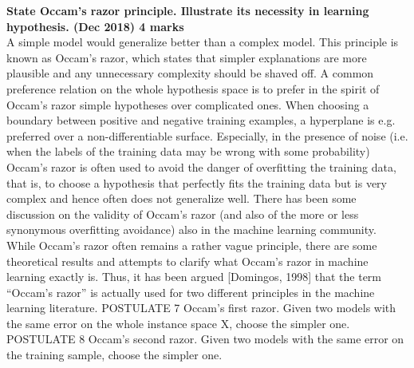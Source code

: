\textbf{\textcolor{LightMagenta}{ State Occam’s razor principle. Illustrate its necessity in learning hypothesis. (Dec 2018) \hfill 4 marks}} \\[5pt]
{A simple model would generalize better than a complex model. This principle is known as Occam’s razor, which states that simpler explanations are more plausible and any unnecessary complexity should be shaved off.
A common preference relation on the whole hypothesis space is to prefer in the spirit of Occam’s razor simple hypotheses over complicated ones. When choosing a boundary between positive and negative training examples, a hyperplane is e.g. preferred over a non-differentiable surface. Especially, in the presence of noise (i.e. when the labels of the training data may be wrong with some probability) Occam’s razor is often used to avoid the danger of overfitting the training data, that is, to choose a hypothesis that perfectly fits the training data but is very complex and hence often does not generalize well. There has been some discussion on the validity of Occam’s razor (and also of the more or less synonymous overfitting avoidance) also in the machine learning community.
While Occam’s razor often remains a rather vague principle, there are some theoretical results and attempts to clarify what Occam’s razor in machine learning exactly is. Thus, it has been argued [Domingos, 1998] that the term “Occam’s razor” is actually used for two different principles in the machine learning literature. POSTULATE 7 Occam’s first razor. Given two models with the same error on the whole instance space X, choose the simpler one. POSTULATE 8 Occam’s second razor. Given two models with the same error on the training sample, choose the simpler one.}